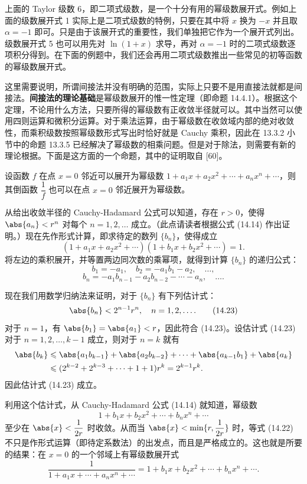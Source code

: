\begin{xremark}
上面的 Taylor 级数 6，即二项式级数，是一个十分有用的幂级数展开式。例如上面的级数展开式 1 实际上是二项式级数的特例，只要在其中将 $x$ 换为 $-x$ 并且取 $\alpha=-1$ 即可。只是由于该展开式的重要性，我们单独把它作为一个展开式列出。级数展开式 5 也可以用先对 $\ln(1+x)$ 求导，再对 $\alpha=-1$ 时的二项式级数逐项积分得到。在下面的例题中，我们还会再用二项式级数推出一些常见的初等函数的幂级数展开式。

这里需要说明，所谓间接法并没有明确的范围，实际上只要不是用直接法就都是间接法。\textbf{间接法的理论基础}是幂级数展开的惟一性定理（即命题 14.4.1）。根据这个定理，不论用什么方法，只要所得的幂级数有正收敛半径就可以。其中当然可以使用四则运算和微积分运算。对于乘法运算，由于幂级数在收敛域内部的绝对收敛性，而乘积级数按照幂级数形式写出时恰好就是 Cauchy 乘积，因此在 13.3.2 小节中的命题 13.3.5 已经解决了幂级数的相乘问题。但是对于除法，则需要有新的理论根据。下面是这方面的一个命题，其中的证明取自 [60]。
\end{xremark}

\begin{xproposition}[14.4.4]
设函数 $f$ 在点 $x=0$ 邻近可以展开为幂级数 $1+a_1x+a_2x^2+\cdots+a_nx^n+\cdots$，则其倒函数 $\dfrac1f$ 也可以在点 $x=0$ 邻近展开为幂级数。
\end{xproposition}
\begin{xproof}
从给出收敛半径的 Cauchy-Hadamard 公式可以知道，存在 $r>0$，使得 $\abs{a_n}<r^n$ 对每个 $n=1,2,\ldots$ 成立。（此点请读者根据公式 (14.14) 作出证明。）现在先作形式计算，即求待定的数列 $\{b_n\}$，使得成立
\begin{equation}
  (1+a_1x+a_2x^2+\cdots)(1+b_1x+b_2x^2+\cdots)=1.
  \tag{14.22}
  \label{eq:14.22}
\end{equation}
将左边的乘积展开，并等置两边同次数的乘幂项，就得到计算 $\{b_n\}$ 的递归公式：
\[
  b_1=-a_1,\quad b_2=-a_1b_1-a_2,\quad\ldots,
\]
\[
  b_n=-a_1b_{n-1}-a_2b_{n-2}-\cdots-a_n,\quad\ldots.
\]

现在我们用数学归纳法来证明，对于 $\{b_n\}$ 有下列估计式：
\begin{equation}
  \abs{b_n}<2^{n-1}r^n,\quad n=1,2,\ldots.
  \tag{14.23}
  \label{eq:14.23}
\end{equation}
对于 $n=1$，有 $\abs{b_1}=\abs{a_1}<r$，因此符合 (14.23)。设估计式 (14.23) 对于 $n=1,2,\ldots,k-1$ 成立，则对于 $n=k$ 就有
\[
\begin{aligned}
  \abs{b_k}&\leqslant\abs{a_1b_{k-1}}+\abs{a_2b_{k-2}}+\cdots+\abs{a_{k-1}b_1}+\abs{a_k}\\
  &\leqslant(2^{k-2}+2^{k-3}+\cdots+1+1)r^k=2^{k-1}r^k.
\end{aligned}
\]
因此估计式 (14.23) 成立。

利用这个估计式，从 Cauchy-Hadamard 公式 (14.14) 就知道，幂级数
\[
  1+b_1x+b_2x^2+\cdots+b_nx^n+\cdots
\]
至少在 $\abs{x}<\dfrac1{2r}$ 时收敛。从而当 $\abs{x}<\min\{r,\dfrac1{2r}\}$ 时，等式 (14.22) 不只是作形式运算（即待定系数法）的出发点，而且是严格成立的。这也就是所要的结果：在 $x=0$ 的一个邻域上有幂级数展开式
\[
  \frac1{1+a_1x+\cdots+a_nx^n+\cdots}=1+b_1x+b_2x^2+\cdots+b_nx^n+\cdots.
\]
\end{xproof}

